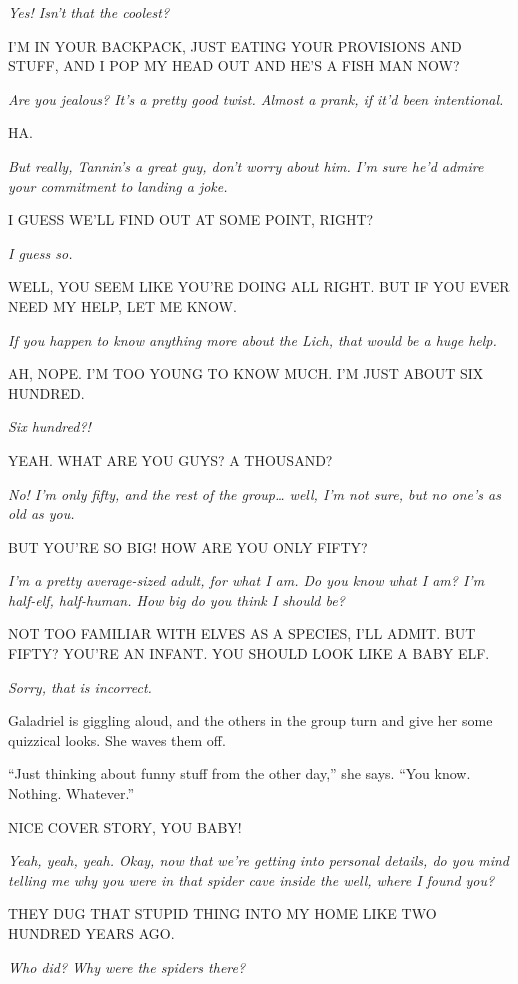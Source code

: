 \documentclass[smalldemyvopaper,11pt,twoside,onecolumn,openright,extrafontsizes]{memoir}
\begin{document}
\emph{Yes! Isn't that the coolest?}

I'M IN YOUR BACKPACK, JUST EATING YOUR PROVISIONS AND STUFF, AND I POP
MY HEAD OUT AND HE'S A FISH MAN NOW?

\emph{Are you jealous? It's a pretty good twist. Almost a prank, if it'd
been intentional.}

HA.

\emph{But really, Tannin's a great guy, don't worry about him. I'm sure
he'd admire your commitment to landing a joke.}

I GUESS WE'LL FIND OUT AT SOME POINT, RIGHT?

\emph{I guess so.}

WELL, YOU SEEM LIKE YOU'RE DOING ALL RIGHT. BUT IF YOU EVER NEED MY
HELP, LET ME KNOW.

\emph{If you happen to know anything more about the Lich, that would be
a huge help.}

AH, NOPE. I'M TOO YOUNG TO KNOW MUCH. I'M JUST ABOUT SIX HUNDRED.

\emph{Six hundred?!}

YEAH. WHAT ARE YOU GUYS? A THOUSAND?

\emph{No! I'm only fifty, and the rest of the group\ldots{} well, I'm
not sure, but no one's as old as you.}

BUT YOU'RE SO BIG! HOW ARE YOU ONLY FIFTY?

\emph{I'm a pretty average-sized adult, for what I am. Do you know what
I am? I'm half-elf, half-human. How big do you think I should be?}

NOT TOO FAMILIAR WITH ELVES AS A SPECIES, I'LL ADMIT. BUT FIFTY? YOU'RE
AN INFANT. YOU SHOULD LOOK LIKE A BABY ELF.

\emph{Sorry, that is incorrect.}

Galadriel is giggling aloud, and the others in the group turn and give
her some quizzical looks. She waves them off.

``Just thinking about funny stuff from the other day,'' she says. ``You
know. Nothing. Whatever.''

NICE COVER STORY, YOU BABY!

\emph{Yeah, yeah, yeah. Okay, now that we're getting into personal
details, do you mind telling me why you were in that spider cave inside
the well, where I found you?}

THEY DUG THAT STUPID THING INTO MY HOME LIKE TWO HUNDRED YEARS AGO.

\emph{Who did? Why were the spiders there?}
\end{document}
